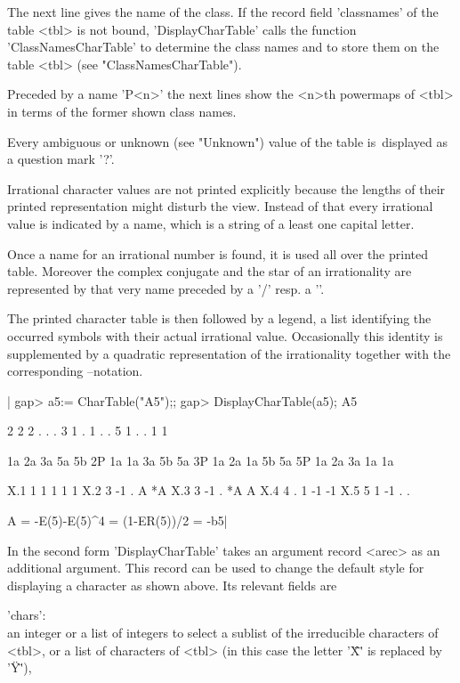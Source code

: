 The next line gives the name of the class. If the record field
'classnames' of the table <tbl> is not bound, 'DisplayCharTable'
calls the function 'ClassNamesCharTable' to determine the class names
and to store them on the table <tbl> (see "ClassNamesCharTable").

Preceded by a name 'P<n>' the next lines show the <n>th powermaps
of <tbl> in terms of the former shown class names.

Every  ambiguous  or  unknown  (see "Unknown")  value  of  the  table  is\
displayed as a question mark '?'.

Irrational character values are not printed explicitly because the
lengths of their printed representation might disturb the view.
Instead of that every irrational value is indicated by a name, which
is a string of a least one capital letter.

Once a name for an irrational number is found, it is used all over the
printed table. Moreover the complex conjugate and the star of an
irrationality are represented by that very name preceded by a '/'
resp. a '\*'.

The printed  character  table  is  then followed  by  a  legend,  a  list
identifying  the  occurred  symbols with their actual  irrational  value.
Occasionally this identity is supplemented by a quadratic  representation
of the irrationality together with the corresponding \ATLAS--notation.

|    gap> a5:= CharTable("A5");;
    gap> DisplayCharTable(a5);
    A5

         2  2  2  .  .  .
         3  1  .  1  .  .
         5  1  .  .  1  1

           1a 2a 3a 5a 5b
        2P 1a 1a 3a 5b 5a
        3P 1a 2a 1a 5b 5a
        5P 1a 2a 3a 1a 1a

    X.1     1  1  1  1  1
    X.2     3 -1  .  A *A
    X.3     3 -1  . *A  A
    X.4     4  .  1 -1 -1
    X.5     5  1 -1  .  .

    A = -E(5)-E(5)^4
      = (1-ER(5))/2 = -b5|

In the second form 'DisplayCharTable' takes an argument record <arec> as
an additional argument. This record can be used to change the default
style for displaying a character as shown above. Its relevant fields
are

'chars': \\ an integer or a list of integers to select a sublist of the
irreducible characters of <tbl>, or a list of characters of <tbl>
(in this case the letter '\"X\"' is replaced by '\"Y\"'),

